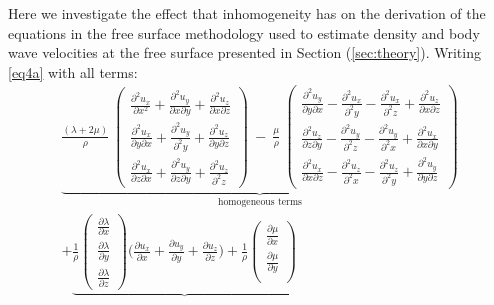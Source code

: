 \documentclass{article}
\begin{document}
	Here we investigate the effect that inhomogeneity has on the derivation of the equations in the free surface methodology used to estimate density and body wave velocities at the free surface presented in Section (\ref{sec:theory}).   Writing \eqref{eq4a} with all terms:
	\begin{align}
		\underbrace{\frac{(\lambda + 2\mu)}{\rho} \: 
			\begin{pmatrix}
				\frac{\partial^{2}u_{x}}{\partial x^{2}} +  \frac{\partial^{2}u_{y}}{\partial x \partial y} + \frac{\partial^{2}u_{z}}{\partial x \partial z} \\
				\frac{\partial^{2}u_{x}}{\partial y \partial x} +  \frac{\partial^{2}u_{y}}{\partial^{2} y } + \frac{\partial^{2}u_{z}}{\partial y \partial z}   \\
				\frac{\partial^{2}u_{x}}{\partial z \partial x} +  \frac{\partial^{2}u_{y}}{\partial z \partial y} + \frac{\partial^{2}u_{z}}{\partial^{2} z} 
			\end{pmatrix} 
			\: - \: \frac{\mu}{\rho} \:
			\begin{pmatrix}
				\frac{\partial^{2}u_{y}}{\partial y \partial x} -  \frac{\partial^{2}u_{x}}{\partial^{2} y } -  \frac{\partial^{2}u_{x}}{\partial^{2} z} + \frac{\partial^{2}u_{z}}{\partial x \partial z} \\
				\frac{\partial^{2}u_{z}}{\partial z \partial y} -  \frac{\partial^{2}u_{y}}{\partial^{2} z } -  \frac{\partial^{2}u_{y}}{\partial^{2} x} + \frac{\partial^{2}u_{x}}{\partial x \partial y}   \\
				\frac{\partial^{2}u_{x}}{\partial x \partial z} -  \frac{\partial^{2}u_{z}}{\partial^{2} x } -  \frac{\partial^{2}u_{z}}{\partial^{2} y} + \frac{\partial^{2}u_{y}}{\partial y \partial z}
		\end{pmatrix}}_\text{homogeneous terms} \\ \nonumber
		+ \underbrace{\frac{1}{\rho}
			\begin{pmatrix}
				\frac{\partial \lambda}{\partial x}\\
				\frac{\partial \lambda}{\partial y}\\
				\frac{\partial \lambda}{\partial z}
			\end{pmatrix}
			\Big(\frac{\partial u_{x}}{\partial x} + \frac{\partial u_{y}}{\partial y} +\frac{\partial u_{z}}{\partial z}\Big) + \frac{1}{\rho} 
			\begin{pmatrix}
				\frac{\partial \mu}{\partial x}\\
				\frac{\partial \mu}{\partial y}\\

\end{pmatrix}}
\end{align}
\end{document}
